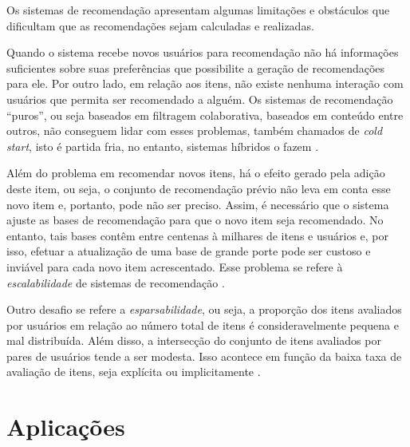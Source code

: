     Os sistemas de recomendação apresentam algumas limitações e obstáculos que dificultam que as recomendações sejam calculadas e realizadas. 
    
    Quando o sistema recebe novos usuários para recomendação não há informações suficientes sobre suas preferências que possibilite a geração de  recomendações para ele. Por outro lado, em relação aos itens, não existe nenhuma interação com usuários que permita ser recomendado a alguém. Os sistemas de recomendação ``puros'', ou seja baseados em filtragem colaborativa, baseados em conteúdo entre outros, não conseguem lidar com esses problemas, também chamados de \textit{cold start}, isto é partida fria, no entanto, sistemas híbridos o fazem \cite{Miranda2010}.
    
    Além do problema em recomendar novos itens, há o efeito gerado pela adição deste item, ou seja, o conjunto de recomendação prévio não leva em conta esse novo item e, portanto, pode não ser preciso. Assim, é necessário que o sistema ajuste as bases de recomendação para que o novo item seja recomendado. No entanto, tais bases contêm entre centenas à milhares de itens e usuários e, por isso, efetuar a atualização de uma base de grande porte pode ser custoso e inviável para cada novo item acrescentado. Esse problema se refere à \textit{escalabilidade} de sistemas de recomendação \cite{Lue2012}. 
    
    Outro desafio se refere a \textit{esparsabilidade}, ou seja, a proporção dos itens avaliados por usuários em relação ao número total de itens é consideravelmente pequena e mal distribuída. Além disso, a intersecção do conjunto de itens avaliados por pares de usuários tende a ser modesta. Isso acontece em função da baixa taxa de avaliação de itens, seja explícita ou implicitamente \cite{Lue2012}.


\section{Aplicações}

